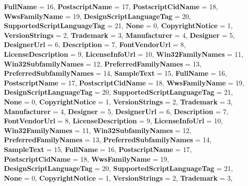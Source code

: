 \begin{DoxyCompactItemize}
{\bfseries Full\+Name} = 16, 
{\bfseries Postscript\+Name} = 17, 
{\bfseries Postscript\+Cid\+Name} = 18, 
{\bfseries Wws\+Family\+Name} = 19, 
\newline
{\bfseries Design\+Script\+Language\+Tag} = 20, 
{\bfseries Supported\+Script\+Language\+Tag} = 21, 
{\bfseries None} = 0, 
{\bfseries Copyright\+Notice} = 1, 
\newline
{\bfseries Version\+Strings} = 2, 
{\bfseries Trademark} = 3, 
{\bfseries Manufacturer} = 4, 
{\bfseries Designer} = 5, 
\newline
{\bfseries Designer\+Url} = 6, 
{\bfseries Description} = 7, 
{\bfseries Font\+Vendor\+Url} = 8, 
{\bfseries License\+Description} = 9, 
\newline
{\bfseries License\+Info\+Url} = 10, 
{\bfseries Win32\+Family\+Names} = 11, 
{\bfseries Win32\+Subfamily\+Names} = 12, 
{\bfseries Preferred\+Family\+Names} = 13, 
\newline
{\bfseries Preferred\+Subfamily\+Names} = 14, 
{\bfseries Sample\+Text} = 15, 
{\bfseries Full\+Name} = 16, 
{\bfseries Postscript\+Name} = 17, 
\newline
{\bfseries Postscript\+Cid\+Name} = 18, 
{\bfseries Wws\+Family\+Name} = 19, 
{\bfseries Design\+Script\+Language\+Tag} = 20, 
{\bfseries Supported\+Script\+Language\+Tag} = 21, 
\newline
{\bfseries None} = 0, 
{\bfseries Copyright\+Notice} = 1, 
{\bfseries Version\+Strings} = 2, 
{\bfseries Trademark} = 3, 
\newline
{\bfseries Manufacturer} = 4, 
{\bfseries Designer} = 5, 
{\bfseries Designer\+Url} = 6, 
{\bfseries Description} = 7, 
\newline
{\bfseries Font\+Vendor\+Url} = 8, 
{\bfseries License\+Description} = 9, 
{\bfseries License\+Info\+Url} = 10, 
{\bfseries Win32\+Family\+Names} = 11, 
\newline
{\bfseries Win32\+Subfamily\+Names} = 12, 
{\bfseries Preferred\+Family\+Names} = 13, 
{\bfseries Preferred\+Subfamily\+Names} = 14, 
{\bfseries Sample\+Text} = 15, 
\newline
{\bfseries Full\+Name} = 16, 
{\bfseries Postscript\+Name} = 17, 
{\bfseries Postscript\+Cid\+Name} = 18, 
{\bfseries Wws\+Family\+Name} = 19, 
\newline
{\bfseries Design\+Script\+Language\+Tag} = 20, 
{\bfseries Supported\+Script\+Language\+Tag} = 21, 
{\bfseries None} = 0, 
{\bfseries Copyright\+Notice} = 1, 
\newline
{\bfseries Version\+Strings} = 2, 
{\bfseries Trademark} = 3, 

\end{DoxyCompactItemize}
